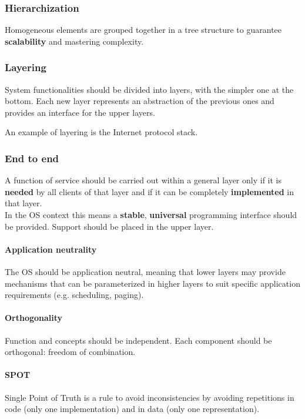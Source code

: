 \subsubsection{Hierarchization}
Homogeneous elements are grouped together in a tree structure to guarantee \textbf{scalability} and mastering complexity.

\subsubsection{Layering}
System functionalities should be divided into layers, with the simpler one at the bottom. Each new layer represents an abstraction of the previous ones and provides an interface for the upper layers.
\begin{example}
	An example of layering is the Internet protocol stack.
\end{example}

\subsubsection{End to end}
A function of service should be carried out within a general layer only if it is \textbf{needed} by all clients of that layer and if it can be completely \textbf{implemented} in that layer.\\
In the OS context this means a \textbf{stable}, \textbf{universal} programming interface should be provided. Support should be placed in the upper layer.
\paragraph{Application neutrality} The OS should be application neutral, meaning that lower layers may provide mechanisms that can be parameterized in higher layers to suit specific application requirements (e.g. scheduling, paging).
\paragraph{Orthogonality} Function and concepts should be independent. Each component should be orthogonal: freedom of combination.
\paragraph{SPOT} Single Point of Truth is a rule to avoid inconsistencies by avoiding repetitions in code (only one implementation) and in data (only one representation).